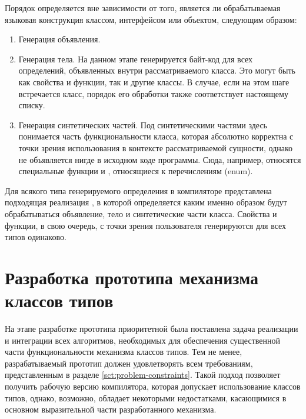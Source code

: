 Порядок определяется вне зависимости от того, является ли обрабатываемая языковая конструкция классом, интерфейсом или объектом, следующим образом:
\begin{enumerate}
    \item Генерация объявления.
    \item Генерация тела. На данном этапе генерируется байт-код для всех определений, объявленных внутри рассматриваемого класса. Это могут быть как свойства и функции, так и другие классы. В случае, если на этом шаге встречается класс, порядок его обработки также соответствует настоящему списку. 
    \item Генерация синтетических частей. Под синтетическими частями здесь понимается часть функциональности класса, которая абсолютно корректна с точки зрения использования в контексте рассматриваемой сущности, однако не объявляется нигде в исходном коде программы. Сюда, например, относятся специальные функции  и , относящиеся к перечислениям (enum).%
\end{enumerate}
Для всякого типа генерируемого определения в компиляторе представлена подходящая реализация , в которой определяется каким именно образом будут обрабатываться объявление, тело и синтетические части класса. Свойства и функции, в свою очередь, с точки зрения пользователя  генерируются для всех типов одинаково.

\section{Разработка прототипа механизма классов типов}

На этапе разработке прототипа приоритетной была поставлена задача реализации и интеграции всех алгоритмов, необходимых для обеспечения существенной части функциональности механизма классов типов. 
Тем не менее, разрабатываемый прототип должен удовлетворять всем требованиям, представленным в разделе \ref{sct:problem-constraints}. Такой подход позволяет получить рабочую версию компилятора, которая допускает использование классов типов, однако, возможно, обладает некоторыми недостатками, касающимися в основном выразительной части разработанного механизма. 

